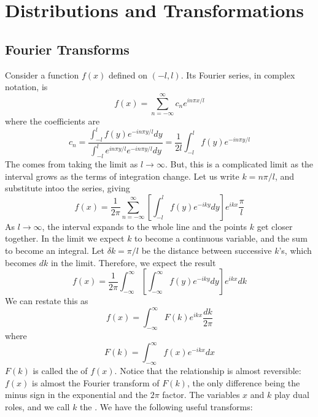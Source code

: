 %
%
%
\chapter{Distributions and Transformations}
\label{Distr} %

\section{Fourier Transforms}


Consider a function $f(x)$ defined on $(-l,l)$. Its Fourier series, in complex notation, is \begin{equation*}
    f(x) = \sum_{n=-\infty}^{\infty}c_ne^{in\pi x/l}
\end{equation*}
where the coefficients are \begin{equation*}
    c_n = \frac{\int_{-l}^lf(y)e^{-in\pi y/l}dy}{\int_{-l}^le^{in\pi y/l}e^{-in\pi y/l}dy} = \frac{1}{2l}\int_{-l}^lf(y)e^{-in\pi y/l}
\end{equation*}
The  comes from taking the limit as $l\rightarrow \infty$. But, this is a complicated limit as the interval grows as the terms of integration change. Let us write $k = n\pi/l$, and substitute intoo the series, giving \begin{equation*}
    f(x) = \frac{1}{2\pi}\sum_{n=-\infty}^{\infty}\left[\int_{-l}^lf(y)e^{-iky}dy\right]e^{ikx}\frac{\pi}{l}
\end{equation*}
As $l\rightarrow \infty$, the interval expands to the whole line and the points $k$ get closer together. In the limit we expect $k$ to become a continuous variable, and the sum to become an integral. Let $\delta k = \pi/l$ be the distance between successive $k$'s, which becomes $dk$ in the limit. Therefore, we expect the result \begin{equation*}
    f(x) = \frac{1}{2\pi}\int_{-\infty}^{\infty}\left[\int_{-\infty}^{\infty}f(y)e^{-iky}dy\right]e^{ikx}dk
\end{equation*}
We can restate this as \begin{equation}
    \boxed{f(x) = \int_{-\infty}^{\infty}F(k)e^{ikx}\frac{dk}{2\pi}}
\end{equation}
where \begin{equation}
    \boxed{F(k) = \int_{-\infty}^{\infty}f(x)e^{-ikx}dx}
\end{equation}
$F(k)$ is called the  of $f(x)$. Notice that the relationship is almost reversible: $f(x)$ is almost the Fourier transform of $F(k)$, the only difference being the minus sign in the exponential and the $2\pi$ factor. The variables $x$ and $k$ play dual roles, and we call $k$ the . We have the following useful transforms:

